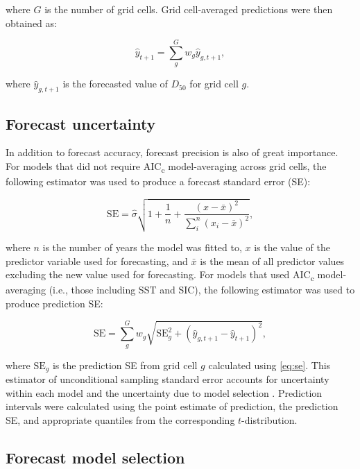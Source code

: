 \documentclass[12pt,]{book}
\theoremstyle{definition}
\theoremstyle{definition}
\theoremstyle{definition}
\theoremstyle{remark}
\begin{document}
\noindent
where \(G\) is the number of grid cells. Grid cell-averaged predictions
were then obtained as:

\begin{equation}
  \hat{y}_{t+1}=\sum_g^G w_g \hat{y}_{g,t+1},
\label{eq:grid-avg-fcst}
\end{equation}

\noindent
where \(\hat{y}_{g,t+1}\) is the forecasted value of \(D_{50}\) for grid
cell \(g\).

\subsection{Forecast uncertainty}\label{forecast-uncertainty}

\noindent
In addition to forecast accuracy, forecast precision is also of great
importance. For models that did not require AIC\textsubscript{c}
model-averaging across grid cells, the following estimator was used to
produce a forecast standard error (SE):

\begin{equation}
  \text{SE}=\hat{\sigma} \sqrt{1 + \frac{1}{n} + \frac{(x-\bar{x})^2}{\sum_i^n(x_i-\bar{x})^2}},
\label{eq:se}
\end{equation}

\noindent
where \(n\) is the number of years the model was fitted to, \(x\) is the
value of the predictor variable used for forecasting, and \(\bar{x}\) is
the mean of all predictor values excluding the new value used for
forecasting. For models that used AIC\textsubscript{c} model-averaging
(i.e., those including SST and SIC), the following estimator was used to
produce prediction SE:

\begin{equation}
  \text{SE}=\sum_g^G w_g \sqrt{\text{SE}_g^2+(\hat{y}_{g,t+1}-\hat{y}_{t+1})^2},
\label{eq:mod-avg-se}
\end{equation}

\noindent
where \(\text{SE}_g\) is the prediction SE from grid cell \(g\)
calculated using \eqref{eq:se}. This estimator of unconditional sampling
standard error accounts for uncertainty within each model and the
uncertainty due to model selection \citep{burnham-anderson-2002}.
Prediction intervals were calculated using the point estimate of
prediction, the prediction SE, and appropriate quantiles from the
corresponding \(t\)-distribution.

\subsection{Forecast model selection}\label{model-selection}
\end{document}
